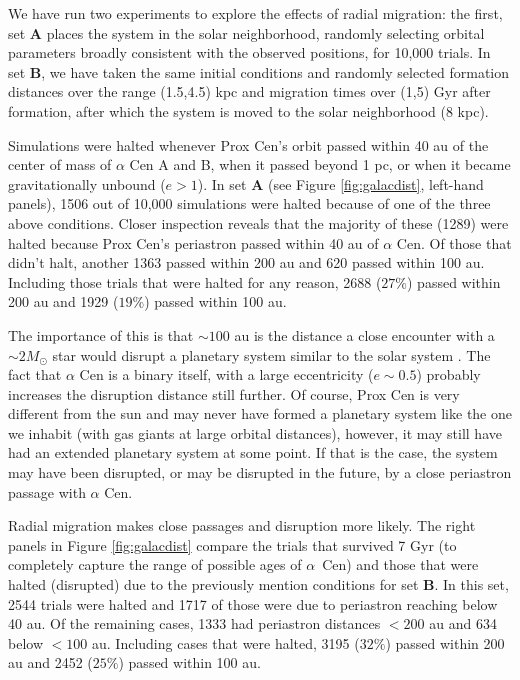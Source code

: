 \documentclass[preprint,12pt]{aastex}
\def\acen{{$\alpha$~Cen}}
\begin{document}
We have run two experiments to explore the effects of radial migration: the first, 
set \textbf{A} places the system in the solar neighborhood, randomly selecting 
orbital parameters broadly consistent with the observed positions, for 10,000 
trials. In set \textbf{B}, we have taken the same initial conditions and randomly 
selected formation distances over the range (1.5,4.5) kpc and migration times
over (1,5) Gyr after formation, after which the system is moved to the solar 
neighborhood (8 kpc). 

Simulations were halted whenever Prox Cen's orbit passed within 40 au of 
the center of mass of $\alpha$ Cen A and B, when it passed beyond 1 pc,
or when it became gravitationally unbound ($e > 1$). In set \textbf{A} 
(see Figure \ref{fig:galacdist}, left-hand panels), 1506 
out of 10,000 simulations were halted because of one of the three above conditions.
Closer inspection reveals that the majority of these (1289) were halted because 
Prox Cen's periastron passed within 40 au of $\alpha$ Cen. Of those that didn't
halt, another 1363 passed within 200 au and 620 passed within 100 au. Including 
those trials that were halted for any reason, 2688 ($27\%$) passed within 200 au and
1929 ($19\%$) passed within 100 au. 

The importance of this is that $\sim 100$ au is the distance a close encounter with a 
$\sim 2 M_{\odot}$ star would disrupt a planetary system similar to the solar system
\citep{Kaib13}. The fact that $\alpha$ Cen is a binary itself, with a large eccentricity 
($e \sim 0.5$) probably increases the disruption distance still further.
Of course, Prox Cen is very different from the sun and may never 
have formed a planetary system like the one we inhabit (with gas giants at large 
orbital distances), however, it may still have had an extended planetary system
at some point. If that is the case, the system may have been disrupted, or may be
disrupted in the future, by a close periastron passage with $\alpha$ Cen.

Radial migration makes close passages and disruption more likely. The right 
panels in Figure \ref{fig:galacdist} compare the trials that survived 7 Gyr (to completely 
capture the range of possible ages of \acen)
and those that were halted (disrupted) due to the previously mention conditions 
for set \textbf{B}. In this set, 2544 trials were halted and 1717 of those were 
due to periastron reaching below 40 au. Of the remaining cases, 1333 had 
periastron distances $< 200$ au and 634 below $<100$ au. Including
cases that were halted, 3195 ($32\%$) passed within 200 au and 2452 ($25\%$) 
passed within 100 au.
\end{document}
